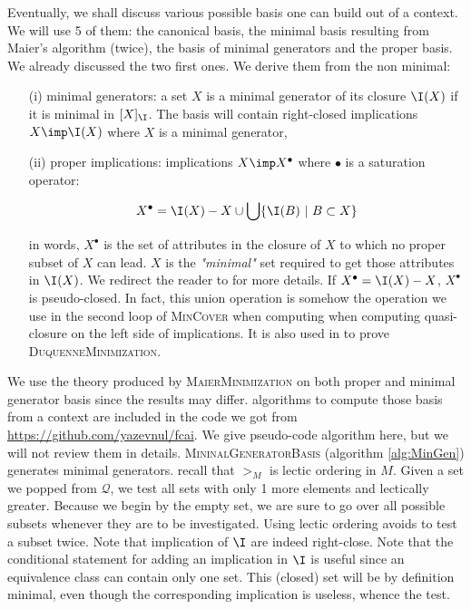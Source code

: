 \vspace{1.2em}

Eventually, we shall discuss various possible basis one can build out of a context. We will use 5 of them: the canonical basis, the minimal basis resulting from Maier's algorithm (twice), the basis of minimal generators and the proper basis. We already discussed the two first ones. We derive them from the non minimal:
\begin{itemize}
	\item[(i)] minimal generators: a set $X$ is a minimal generator of its closure $\I(X)$ if it is minimal in $[ X]_{\I}$. The basis will contain
	right-closed implications $X \imp \I(X)$ where $X$ is a minimal generator,
	\item[(ii)] proper implications: implications $X \imp X^{\bullet}$ where 
	$\bullet$ is a saturation operator:
	
		\[ X^{\bullet} = \I(X) - X \cup \bigcup \{ \I(B) \ | \ B \subset X \} \]
		
	in words, $X^{\bullet}$ is the set of attributes in the closure of $X$ to
	which no proper subset of $X$ can lead. $X$ is the \textit{"minimal"} set required to get those attributes in $\I(X)$. We redirect the reader to 
	\cite{b._ganter_conceptual_2016} for more details. If $X^{\bullet} = \I(X) - X$, $X^{\bullet}$ is pseudo-closed. In fact, this union operation is somehow the operation we use in the second loop of \textsc{MinCover} when
	computing when computing quasi-closure on the left side of implications.
	It is also used in \cite{duquenne_variations_2007} to prove \textsc{DuquenneMinimization}.
\end{itemize}
\noindent We use the theory produced by \textsc{MaierMinimization} on both proper and minimal generator basis since the results may differ. algorithms to compute those basis from a context are included in the code we got from \url{https://github.com/yazevnul/fcai}. We give pseudo-code algorithm here, but we will not review them in details. \textsc{MininalGeneratorBasis} (algorithm \ref{alg:MinGen}) generates minimal 
generators. recall that $>_{M}$ is lectic ordering in $M$. Given a set we popped
from $\mathcal{Q}$, we test all sets with only 1 more elements and lectically
greater. Because we begin by the empty set, we are sure to go over all possible
subsets whenever they are to be investigated. Using lectic ordering avoids to
test a subset twice. Note that implication of $\I$ are indeed right-close.
Note that the conditional statement for adding an implication in $\I$ is useful
since an equivalence class can contain only one set. This (closed) set will
be by definition minimal, even though the corresponding implication is useless,
whence the test.

